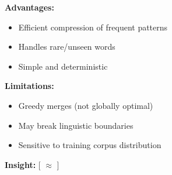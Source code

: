 \documentclass[10pt,a4paper]{article}
\begin{document}
\textbf{Advantages:}
\begin{itemize}
\item Efficient compression of frequent patterns
\item Handles rare/unseen words
\item Simple and deterministic
\end{itemize}

\textbf{Limitations:}
\begin{itemize}
\item Greedy merges (not globally optimal)
\item May break linguistic boundaries
\item Sensitive to training corpus distribution
\end{itemize}

\textbf{Insight:}
[
 $\approx$ 
]
\end{document}
